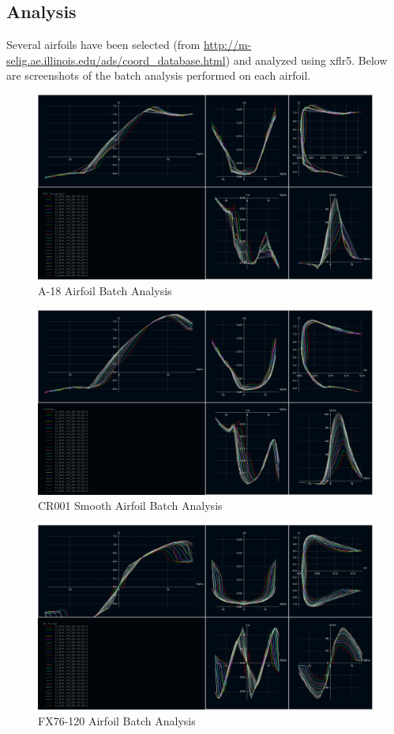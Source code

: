 \documentclass[]{article}
\begin{document}
\subsection{Analysis}

Several airfoils have been selected (from \url{http://m-selig.ae.illinois.edu/ads/coord_database.html}) and analyzed using xflr5. Below are screenshots of the batch analysis performed on each airfoil. \\

\begin{figure}[H]
\includegraphics[scale=0.4]{a18_batch}
\caption{A-18 Airfoil Batch Analysis}
\end{figure}

\begin{figure}[H]
\includegraphics[scale=0.4]{cr001sm_batch}
\caption{CR001 Smooth Airfoil Batch Analysis}
\end{figure}

\begin{figure}[H]
\includegraphics[scale=0.4]{fx76-120_batch}
\caption{FX76-120 Airfoil Batch Analysis}
\end{figure}
\end{document}
